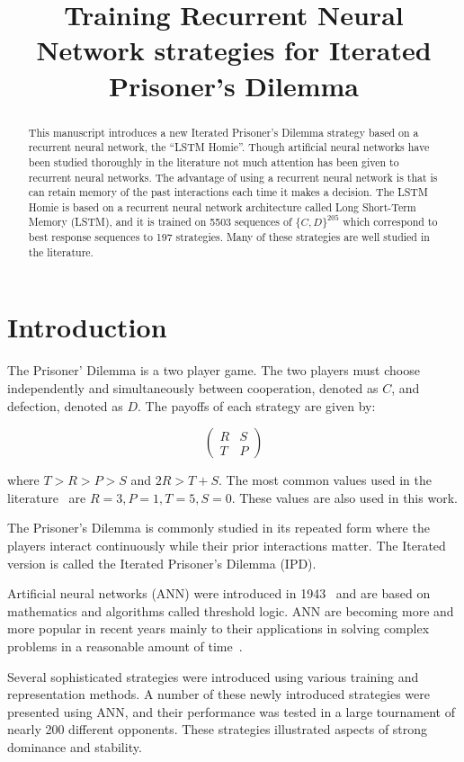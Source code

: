 \documentclass{article}
\title{Training Recurrent Neural Network strategies for Iterated Prisoner's Dilemma}
\author{}
\date{}
\begin{document}
\maketitle

\begin{abstract}
This manuscript introduces a new Iterated Prisoner's Dilemma strategy based on a
recurrent neural network, the ``LSTM Homie''. Though artificial neural networks
have been studied thoroughly in the literature not much attention has been given
to recurrent neural networks. The advantage of using a recurrent neural network
is that is can retain memory of the past interactions each time it makes a
decision. The LSTM Homie is based on a recurrent neural network architecture
called Long Short-Term Memory (LSTM), and it is trained on 5503
sequences of \(\{C, D\}^{205}\) which correspond to best response sequences to
197 strategies. Many of these strategies are well studied in the literature.
\end{abstract}

\section{Introduction}

The Prisoner' Dilemma is a two player game. The two players must choose independently
and simultaneously between cooperation, denoted as \(C\), and defection, denoted
as \(D\). The payoffs of each strategy are given by:

\[\begin{pmatrix}
    R & S \\
    T & P
\end{pmatrix}\]

where \(T > R > P > S\) and \(2R > T + S\). The most common values used in
the literature~\cite{Axelrod1981} are $R=3, P=1, T=5, S=0$. These values are also
used in this work.

The Prisoner's Dilemma is commonly studied in its repeated form where the
players interact continuously while their prior interactions matter. The Iterated
version is called the Iterated Prisoner's Dilemma (IPD).

Artificial neural networks (ANN) were introduced in 1943~\cite{McCulloch1943} and are based on
mathematics and algorithms called threshold logic. ANN are becoming more and
more popular in recent years mainly to their applications in solving complex problems
in a reasonable amount of time~\cite{Lecun2015}.

Several sophisticated strategies were introduced using various
training and representation methods. A number of these newly introduced strategies
were presented using ANN, and their performance was tested in a large tournament of
nearly 200 different opponents. These strategies illustrated aspects of strong
dominance and stability.
\end{document}
